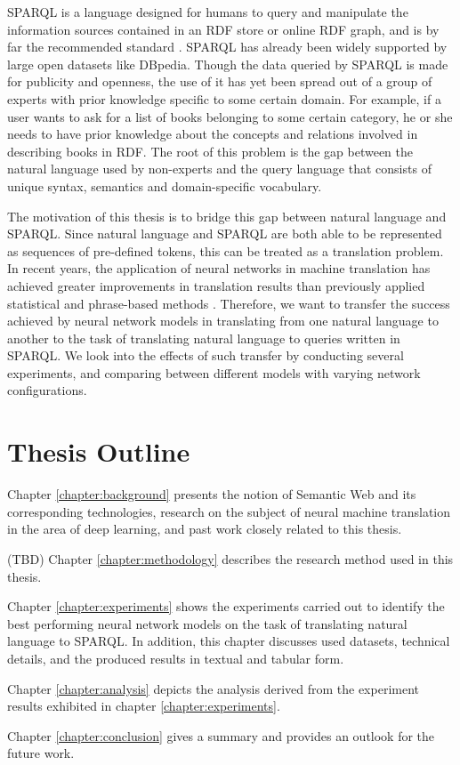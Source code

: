 SPARQL is a language designed for humans to query and manipulate the information sources contained in an RDF store or online RDF graph, and is by far the recommended standard \cite{Harris2013}. SPARQL has already been widely supported by large open datasets like DBpedia. Though the data queried by SPARQL is made for publicity and openness, the use of it has yet been spread out of a group of experts with prior knowledge specific to some certain domain. For example, if a user wants to ask for a list of books belonging to some certain category, he or she needs to have prior knowledge about the concepts and relations involved in describing books in RDF. The root of this problem is the gap between the natural language used by non-experts and the query language that consists of unique syntax, semantics and domain-specific vocabulary. 

The motivation of this thesis is to bridge this gap between natural language and SPARQL. Since natural language and SPARQL are both able to be represented as sequences of pre-defined tokens, this can be treated as a translation problem. In recent years, the application of neural networks in machine translation has achieved greater improvements in translation results than previously applied statistical and phrase-based methods \cite{Moussallem2017}. Therefore, we want to transfer the success achieved by neural network models in translating from one natural language to another to the task of translating natural language to queries written in SPARQL. We look into the effects of such transfer by conducting several experiments, and comparing between different models with varying network configurations. 

\section{Thesis Outline} \label{section:thesis outline}

Chapter \ref{chapter:background} presents the notion of Semantic Web and its corresponding technologies, research on the subject of neural machine translation in the area of deep learning, and past work closely related to this thesis. 

(TBD) Chapter \ref{chapter:methodology} describes the research method used in this thesis.

Chapter \ref{chapter:experiments} shows the experiments carried out to identify the best performing neural network models on the task of translating natural language to SPARQL. In addition, this chapter discusses used datasets, technical details, and the produced results in textual and tabular form.

Chapter \ref{chapter:analysis} depicts the analysis derived from the experiment results exhibited in chapter \ref{chapter:experiments}.

Chapter \ref{chapter:conclusion} gives a summary and provides an outlook for the future work.